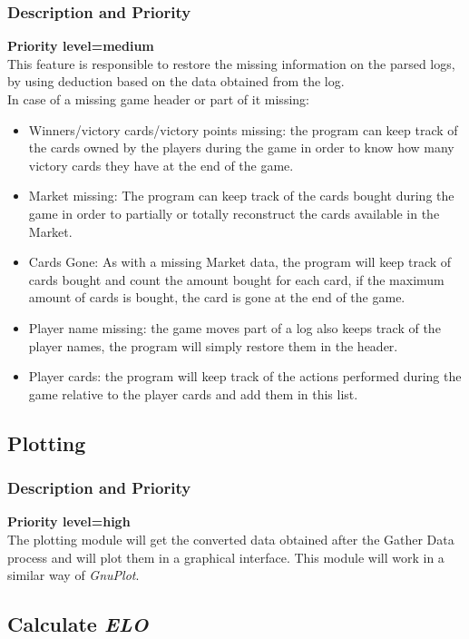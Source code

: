 \documentclass{scrreprt}
\begin{document}
\subsubsection{Description and Priority}
\textbf{Priority level=medium}\\
This feature is responsible to restore the missing information on the parsed
logs, by using deduction based on the data obtained from the log.\\
In case of a missing game header or part of it missing:
  \begin{itemize}
  \item Winners/victory cards/victory points missing: the program can keep track of the cards owned by the players during the game in order to know how many victory cards they have at the end of the game.
  \item Market missing: The program can keep track of the cards bought during the game in order to partially or totally reconstruct the cards available in the Market.
  \item Cards Gone: As with a missing Market data, the program will keep track of cards bought and count the amount bought for each card, if the maximum amount of cards is bought, the card is gone at the end of the game.
  \item Player name missing: the game moves part of a log also keeps track of the player names, the program will simply restore them in the header.
  \item Player cards: the program will keep track of the actions performed during the game relative to the player cards and add them in this list.
  \end{itemize}

\subsection{Plotting}
\subsubsection{Description and Priority}
\textbf{Priority level=high}\\
The plotting module will get the converted data obtained after the Gather Data process and will plot them in a graphical interface. This module will work in a similar way of \textit{GnuPlot}.

\subsection{Calculate \textit{\textbf{ELO}}}
\end{document}
